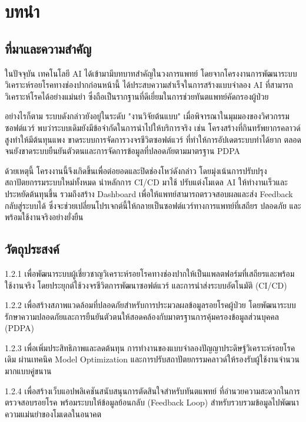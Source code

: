 \chapter{บทนำ}
\label{chapter:introduction}

\section{ที่มาและความสำคัญ}

    ในปัจจุบัน เทคโนโลยี AI ได้เข้ามามีบทบาทสำคัญในวงการแพทย์ โดยจากโครงงานการพัฒนาระบบวิเคราะห์รอยโรคทางช่องปากก่อนหน้านี้ ได้ประสบความสำเร็จในการสร้างแบบจำลอง AI ที่สามารถวิเคราะห์โรคได้อย่างแม่นยำ ซึ่งถือเป็นรากฐานที่ดีเยี่ยมในการช่วยทันตแพทย์คัดกรองผู้ป่วย

    อย่างไรก็ตาม ระบบดังกล่าวยังอยู่ในระดับ "งานวิจัยต้นแบบ" เมื่อพิจารณาในมุมมองของวิศวกรรมซอฟต์แวร์ พบว่าระบบเดิมยังมีข้อจำกัดในการนำไปให้บริการจริง เช่น โครงสร้างที่กินทรัพยากรคลาวด์สูงทำให้มีต้นทุนแพง ขาดระบบการจัดการวงจรชีวิตซอฟต์แวร์ ที่ทำให้การอัปเดตระบบทำได้ยาก ตลอดจนยังขาดระบบยืนยันตัวตนและการจัดการข้อมูลที่ปลอดภัยตามมาตรฐาน PDPA

    ด้วยเหตุนี้ โครงงานนี้จึงเกิดขึ้นเพื่อต่อยอดและปิดช่องโหว่ดังกล่าว โดยมุ่งเน้นการปรับปรุงสถาปัตยกรรมระบบใหม่ทั้งหมด นำหลักการ CI/CD มาใช้ ปรับแต่งโมเดล AI ให้ทำงานเร็วและประหยัดต้นทุนขึ้น รวมถึงสร้าง Dashboard เพื่อให้แพทย์สามารถตรวจสอบผลและส่ง Feedback กลับสู่ระบบได้ ซึ่งจะช่วยเปลี่ยนโปรเจกต์นี้ให้กลายเป็นซอฟต์แวร์ทางการแพทย์ที่เสถียร ปลอดภัย และพร้อมใช้งานจริงอย่างยั่งยืน

\section{วัตถุประสงค์}

    1.2.1 เพื่อพัฒนาระบบผู้เชี่ยวชาญวิเคราะห์รอยโรคทางช่องปากให้เป็นแพลตฟอร์มที่เสถียรและพร้อมใช้งานจริง โดยประยุกต์ใช้วงจรชีวิตการพัฒนาซอฟต์แวร์ และการนำส่งระบบอัตโนมัติ (CI/CD)
    
    1.2.2 เพื่อสร้างสภาพแวดล้อมที่ปลอดภัยสำหรับการประมวลผลข้อมูลรอยโรคผู้ป่วย โดยพัฒนาระบบรักษาความปลอดภัยและการยืนยันตัวตนให้สอดคล้องกับมาตรฐานการคุ้มครองข้อมูลส่วนบุคคล (PDPA)
    
    1.2.3 เพื่อเพิ่มประสิทธิภาพและลดต้นทุน การทำงานของแบบจำลองปัญญาประดิษฐ์วิเคราะห์รอยโรคเดิม ผ่านเทคนิค Model Optimization และการปรับสถาปัตยกรรมคลาวด์ให้รองรับผู้ใช้งานจำนวนมากแบบคู่ขนาน
    
    1.2.4 เพื่อสร้างเว็บแอปพลิเคชันสนับสนุนการตัดสินใจสำหรับทันตแพทย์ ที่อำนวยความสะดวกในการตรวจสอบรอยโรค พร้อมระบบให้ข้อมูลย้อนกลับ (Feedback Loop) สำหรับรวบรวมข้อมูลไปพัฒนาความแม่นยำของโมเดลในอนาคต

